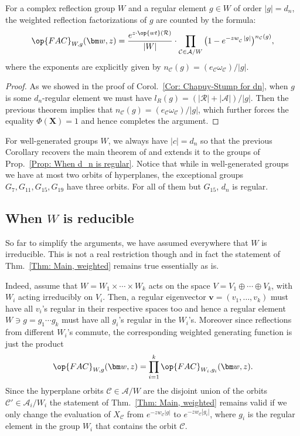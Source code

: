\begin{coro}
For a complex reflection group $W$ and a regular element $g\in W$ of order $|g|=d_n$, the weighted reflection factorizations of $g$ are counted by the formula:
$$\op{FAC}_{W,g}(\bm w,z)=\dfrac{e^{z\cdot\op{wt}(\mathcal{R})}}{|W|}\cdot\prod_{\mathcal{C}\in\mathcal{A}/W}\big(1-e^{-zw_{\mathcal{C}}^{\phantom{l_r}}\!|g|}\big)^{n_\mathcal{C}(g)},$$
where the exponents are explicitly given by $n_{\mathcal{C}}(g)=(e_{\mathcal{C}}\omega_{\mathcal{C}})/|g|$.
\end{coro}
\begin{proof}
As we showed in the proof of Corol.~\ref{Cor: Chapuy-Stump for dn}, when $g$ is some $d_n$-regular element we must have $l_R(g)=(|\mathcal{R}|+|\mathcal{A}|)/|g|$. Then the previous theorem implies that $n_{\mathcal{C}}(g)=(e_{\mathcal{C}}\omega_{\mathcal{C}})/|g|$, which further forces the equality $\Phi(\bm X)=1$ and hence completes the argument.
\end{proof}

\begin{rema}
For well-generated groups $W$, we always have $|c|=d_n$ so that the previous Corollary recovers the main theorem of \cite{reiner-delMas-Hameister} and extends it to the groups of Prop.~\ref{Prop: When d_n is regular}. Notice that while in well-generated groups we have at most two orbits of hyperplanes, the exceptional groups $G_{7},G_{11},G_{15},G_{19}$ have three orbits. For all of them but $G_{15}$, $d_n$ is regular.
\end{rema}

\subsection{When $W$ is reducible}
\label{Section: When W is reducible}

So far to simplify the arguments, we have assumed everywhere that $W$ is irreducible. This is not a real restriction though and in fact the statement of Thm.~\ref{Thm: Main, weighted} remains true essentially as is.

Indeed, assume that $W=W_1\times\cdots\times W_k$ acts on the space $V=V_1\oplus \cdots\oplus V_k$, with $W_i$ acting irreducibly on $V_i$. Then, a regular eigenvector $\bm v=(v_1,\ldots,v_k)$ must have all $v_i$'s regular in their respective spaces too and hence a regular element $W\ni g=g_1\cdots g_k$ must have all $g_i$'s regular in the $W_i$'s. Moreover since reflections from different $W_i$'s commute, the corresponding weighted generating function is just the product $$\op{FAC}_{W,g}(\bm w,z)=\prod_{i=1}^k\op{FAC}_{W_i,g_i}(\bm w,z).$$
Since the hyperplane orbits $\mathcal{C}\in\mathcal{A}/W$ are the disjoint union of the orbits $\mathcal{C}'\in\mathcal{A}_i/W_i$ the statement of Thm.~\ref{Thm: Main, weighted} remains valid if we only change the evaluation of $X_{\mathcal{C}}$ from $e^{-zw^{\phantom{l}}_{\mathcal{C}}|g|}$ to $e^{-zw^{\phantom{l}}_{\mathcal{C}}|g_i|}$, where $g_i$ is the regular element in the group $W_i$ that contains the orbit $\mathcal{C}$. 
